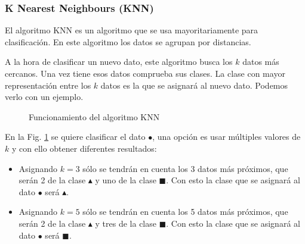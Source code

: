 \subsubsection{K Nearest Neighbours (KNN)}

El algoritmo KNN es un algoritmo que se usa mayoritariamente para clasificación. En este algoritmo los datos se agrupan por distancias.

A la hora de clasificar un nuevo dato, este algoritmo busca los $k$ datos más cercanos. Una vez tiene esos datos comprueba sus clases. La clase con mayor representación entre los $k$ datos es la que se asignará al nuevo dato. Podemos verlo con un ejemplo.

\begin{figure}
    \centering
    \caption{Funcionamiento del algoritmo KNN \cite{knnalgorithm2010}}
    \label{fig:knn_clasification}
\end{figure}

En la Fig. \ref{fig:knn_clasification} se quiere clasificar el dato \textcolor{verdedato}{\Large$\bullet$}, una opción es usar múltiples valores de $k$ y con ello obtener diferentes resultados:
\begin{itemize}
    \item Asignando $k = 3$ sólo se tendrán en cuenta los 3 datos más próximos, que serán 2 de la clase \textcolor{rojodato}{\large$\blacktriangle$} y uno de la clase \textcolor{azuldato}{$\blacksquare$}. Con esto la clase que se asignará al dato \textcolor{verdedato}{\Large$\bullet$} será \textcolor{rojodato}{\large$\blacktriangle$}.
    \item Asignando $k = 5$ sólo se tendrán en cuenta los 5 datos más próximos, que serán 2 de la clase \textcolor{rojodato}{\large$\blacktriangle$} y tres de la clase \textcolor{azuldato}{$\blacksquare$}. Con esto la clase que se asignará al dato \textcolor{verdedato}{\Large$\bullet$} será \textcolor{azuldato}{$\blacksquare$}.
\end{itemize}

